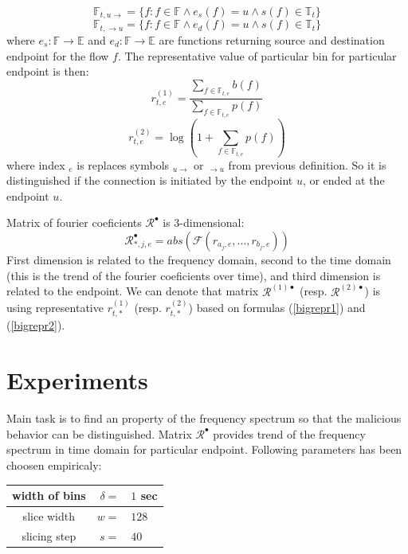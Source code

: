 \documentclass[a4paper]{IEEEtran}
\begin{document}
\begin{equation}
\mathbb{F}_{t,u \rightarrow} = \{f : f \in \mathbb{F} \wedge e_{s}(f) = u \wedge s(f) \in \mathbb{T}_t \}
\end{equation}
\begin{equation}
\mathbb{F}_{t, \rightarrow u} = \{f : f \in \mathbb{F} \wedge e_{d}(f) = u \wedge s(f) \in \mathbb{T}_t \}
\end{equation}
where $e_{s}:\mathbb{F}\rightarrow \mathbb{E}$ and
$e_{d}:\mathbb{F}\rightarrow \mathbb{E}$ 
are functions returning source and destination endpoint for the 
flow $f$.
The representative value of particular bin for particular endpoint is 
then:
\begin{equation}\label{bigrepr1}
r_{t,e}^{(1)} = \frac{\sum\limits_{f\in \mathbb{F}_{t,e}}b(f)}{\sum\limits_{f\in \mathbb{F}_{t,e}}p(f)}
\end{equation}
\begin{equation}\label{bigrepr2}
r_{t,e}^{(2)} = \log(1+\sum\limits_{f\in \mathbb{F}_{t,e}}p(f))
\end{equation}
where index ${}_e$ is replaces symbols ${}_{u\rightarrow}$ or 
${}_{\rightarrow u}$ from previous definition. So it is distinguished 
if the connection is initiated by the endpoint $u$, or ended at the
endpoint $u$.

Matrix of fourier coeficients $\mathcal{R}^\bullet$ is 3-dimensional:
\begin{equation}\label{bigmatrix}
\mathcal{R}^\bullet_{*,j,e} = abs(\mathcal{F}(r_{a_j,e}, ..., r_{b_j,e}))
\end{equation}
First dimension is related to the frequency domain, second to the time domain 
(this is the trend of the fourier coeficients over time), 
and third dimension is related to the endpoint.
We can denote that matrix $\mathcal{R}^{(1)\bullet}$ (resp. $\mathcal{R}^{(2)\bullet}$)
is using representative $r_{t,*}^{(1)}$ (resp. $r_{t,*}^{(2)}$) based on formulas
(\ref{bigrepr1}) and (\ref{bigrepr2}).

\section{Experiments}
Main task is to find an property of the frequency spectrum so that the malicious behavior
can be distinguished. Matrix $\mathcal{R}^\bullet$ provides trend of the frequency spectrum
in time domain for particular endpoint.
Following parameters has been choosen empiricaly:

\begin{center}
\begin{tabular}{c|rl}
width of bins & $\delta =$ & $1$ sec \\ \hline
slice width & $w =$ & $128$ \\ \hline
slicing step & $s=$ & $40$ \\
\end{tabular}
\end{center}
\end{document}
